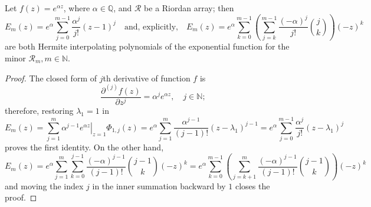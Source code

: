 
\begin{theorem}
\label{thm:exp-Hermite-interpolating-poly}
Let $f(z)=e^{\alpha z}$, where $\alpha\in\mathbb{Q}$, and $\mathcal{R}$ be a Riordan array; then 
\begin{equation}
  E_{m}(z) = e^{\alpha} \sum_{j=0}^{m-1}{\frac{\alpha^{j}}{j!}\left(z-1\right)^{j}}
  \quad\text{and, explicitly,}\quad
  E_{m}(z) = e^{\alpha}\sum_{k=0}^{m-1}{\left(\sum_{j=k}^{m-1}{\frac{(-\alpha)^{j}}{j!}{{j}\choose{k}}}\right)(-z)^{k}}
\end{equation}
are both Hermite interpolating polynomials of the exponential function for the minor
$\mathcal{R}_{m}, m\in\mathbb{N}$.
\end{theorem}

\begin{proof}
The closed form of $j$th derivative of function $f$ is 
\begin{displaymath}
\frac{\partial^{(j)}{f}(z)}{\partial{z}^{j}} = \alpha^{j} e^{\alpha z}, \quad j\in\mathbb{N};
\end{displaymath}
therefore, restoring $\lambda_{1}=1$ in
\begin{displaymath}
  E_{m}(z) = \sum_{j=1}^{m}{ \left. \alpha^{j-1} e^{\alpha z} \right|_{z=1}\Phi_{1,j}(z)}
       = e^{\alpha}\sum_{j=1}^{m}{\frac{\alpha^{j-1}}{(j-1)!} \left(z-\lambda_{1}\right)^{j-1}}
       = e^{\alpha}\sum_{j=0}^{m-1}{\frac{\alpha^{j}}{j!} \left(z-\lambda_{1}\right)^{j}}
\end{displaymath}
proves the first identity. On the other hand,
\begin{displaymath}
  E_{m}(z) = e^{\alpha}\sum_{j=1}^{m}{\sum_{k=0}^{j-1}{\frac{(-\alpha)^{j-1}}{(j-1)!}{{j-1}\choose{k}}(-z)^{k}}} 
       = e^{\alpha}\sum_{k=0}^{m-1}{\left(\sum_{j=k+1}^{m}{\frac{(-\alpha)^{j-1}}{(j-1)!}{{j-1}\choose{k}}}\right)(-z)^{k}}
\end{displaymath}
and moving the index $j$ in the inner summation backward by $1$ closes the proof.
\end{proof}


